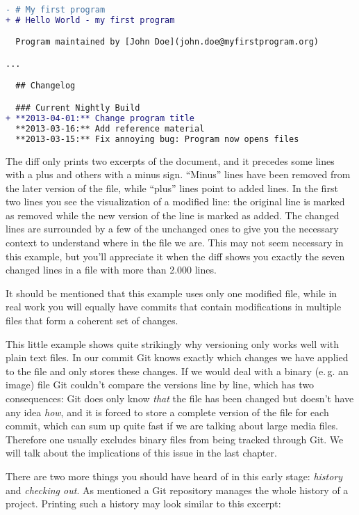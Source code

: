 \documentclass[../../LilyPond-Tutorials]{subfiles}
\begin{document}
\begin{lstlisting}[language=diff, frame=single]
- # My first program
+ # Hello World - my first program

  Program maintained by [John Doe](john.doe@myfirstprogram.org)

...

  ## Changelog

  ### Current Nightly Build
+ **2013-04-01:** Change program title  
  **2013-03-16:** Add reference material  
  **2013-03-15:** Fix annoying bug: Program now opens files
\end{lstlisting}

The diff only prints two excerpts of the document, and it precedes some lines with a plus and others with a minus sign.
“Minus” lines have been removed from the later version of the file, while “plus” lines point to added lines.
In the first two lines you see the visualization of a modified line: the original line is marked as removed while the new version of the line is marked as added.
The changed lines are surrounded by a few of the unchanged ones to give you the necessary context to understand where in the file we are.
This may not seem necessary in this example, but you'll appreciate it when the diff shows you exactly the seven changed lines in a file with more than 2.000 lines.

It should be mentioned that this example uses only one modified file, while in real work you will equally have commits that contain modifications in multiple files that form a coherent set of changes.

This little example shows quite strikingly why versioning only works well with plain text files.
In our commit Git knows exactly which changes we have applied to the file and only stores these changes.
If we would deal with a binary (e.\,g. an image) file  Git couldn't compare the versions line by line, which has two consequences:
Git does only know \emph{that} the file has been changed but doesn't have any idea \emph{how}, and it is forced to store a complete version of the file for each commit, which can sum up quite fast if we are talking about large media files.
Therefore one usually excludes binary files from being tracked through Git.
We will talk about the implications of this issue in the last chapter.

\medskip
There are two more things you should have heard of in this early stage: \emph{history} and \emph{checking out}.
As mentioned a Git repository manages the whole history of a project.
Printing such a history may look similar to this excerpt:
\end{document}
